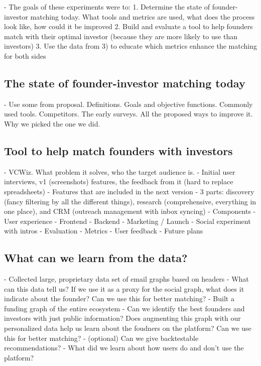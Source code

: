 - The goals of these experiments were to:
  1. Determine the state of founder-investor matching today. What tools and metrics are used, what does the process look like, how could it be improved
  2. Build and evaluate a tool to help founders match with their optimal investor (because they are more likely to use than investors)
  3. Use the data from 3) to educate which metrics enhance the matching for both sides

\subsection{The state of founder-investor matching today}

  - Use some from proposal. Definitions. Goals and objective functions. Commonly used tools. Competitors. The early surveys. All the proposed ways to improve it. Why we picked the one we did.

\subsection{Tool to help match founders with investors}

  - VCWiz. What problem it solves, who the target audience is.
  - Initial user interviews, v1 (screenshots) features, the feedback from it (hard to replace spreadsheets)
  - Features that are included in the next version
    - 3 parts: discovery (fancy filtering by all the different things), research (comprehensive, everything in one place), and CRM (outreach management with inbox syncing)
  - Components
    - User experience
    - Frontend
    - Backend
    - Marketing / Launch
    - Social experiment with intros
  - Evaluation
    - Metrics
    - User feedback
    - Future plans

\subsection{What can we learn from the data?}
  - Collected large, proprietary data set of email graphs based on headers
    - What can this data tell us? If we use it as a proxy for the social graph, what does it indicate about the founder? Can we use this for better matching?
  - Built a funding graph of the entire ecosystem
    - Can we identify the best founders and investors with just public information? Does augmenting this graph with our personalized data help us learn about the foudners on the platform? Can we use this for better matching?
  - (optional) Can we give backtestable recommendations?
  - What did we learn about how users do and don't use the platform?
